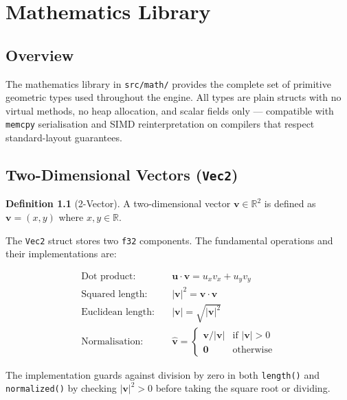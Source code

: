 \documentclass[12pt, a4paper]{report}
\theoremstyle{definition}
\newtheorem{definition}{Definition}[section]
\theoremstyle{remark}
\begin{document}
\chapter{Mathematics Library}

\section{Overview}

The mathematics library in \texttt{src/math/} provides the complete set of
primitive geometric types used throughout the engine. All types are plain
structs with no virtual methods, no heap allocation, and scalar fields
only — compatible with \texttt{memcpy} serialisation and SIMD reinterpretation
on compilers that respect standard-layout guarantees.

\section{Two-Dimensional Vectors (\texttt{Vec2})}

\begin{definition}[2-Vector]
A two-dimensional vector $\mathbf{v} \in \mathbb{R}^2$ is defined as
$\mathbf{v} = (x, y)$ where $x, y \in \mathbb{R}$.
\end{definition}

The \texttt{Vec2} struct stores two \texttt{f32} components. The fundamental
operations and their implementations are:

\begin{align}
  \text{Dot product:} \quad & \mathbf{u} \cdot \mathbf{v} = u_x v_x + u_y v_y \\
  \text{Squared length:} \quad & |\mathbf{v}|^2 = \mathbf{v} \cdot \mathbf{v} \\
  \text{Euclidean length:} \quad & |\mathbf{v}| = \sqrt{|\mathbf{v}|^2} \\
  \text{Normalisation:} \quad & \hat{\mathbf{v}} =
    \begin{cases} \mathbf{v} / |\mathbf{v}| & \text{if } |\mathbf{v}| > 0 \\ \mathbf{0} & \text{otherwise} \end{cases}
\end{align}

The implementation guards against division by zero in both
\texttt{length()} and \texttt{normalized()} by checking
$|\mathbf{v}|^2 > 0$ before taking the square root or dividing.
\end{document}
